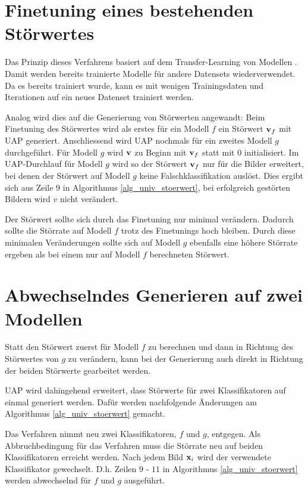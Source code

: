 \documentclass{FFHS_Thesis_Additions/ffhsthesis}
\begin{document}
\section{Finetuning eines bestehenden Störwertes}

Das Prinzip dieses Verfahrens basiert auf dem Transfer-Learning von Modellen \cite{shao_transfer_2015}. 
Damit werden bereits trainierte Modelle für andere Datensets wiederverwendet. 
Da es bereits trainiert wurde, kann es mit wenigen Trainingsdaten und Iterationen auf ein neues Datenset trainiert werden.

Analog wird dies auf die Generierung von Störwerten angewandt: Beim Finetuning des Störwertes wird als erstes für ein Modell $f$ ein Störwert $\bold{v}_f$ mit UAP generiert. 
Anschliessend wird UAP nochmals für ein zweites Modell $g$ durchgeführt. 
Für Modell $g$ wird $\bold{v}$ zu Beginn mit $\bold{v}_f$ statt mit $0$ initialisiert. 
Im UAP-Durchlauf für Modell $g$ wird so der Störwert $\bold{v}_f$ nur für die Bilder erweitert, bei denen der Störwert auf Modell $g$ keine Falschklassifikation auslöst. 
Dies ergibt sich aus Zeile $9$ in Algorithmus \ref{alg_univ_stoerwert}, bei erfolgreich gestörten Bildern wird $v$ nicht verändert. 

Der Störwert sollte sich durch das Finetuning nur minimal verändern. 
Dadurch sollte die Störrate auf Modell $f$ trotz des Finetunings hoch bleiben. 
Durch diese minimalen Veränderungen sollte sich auf Modell $g$ ebenfalls eine höhere Störrate ergeben als bei einem nur auf Modell $f$ berechneten Störwert.


\section{Abwechselndes Generieren auf zwei Modellen}

Statt den Störwert zuerst für Modell $f$ zu berechnen und dann in Richtung des Störwertes von $g$ zu verändern, kann bei der Generierung auch direkt in Richtung der beiden Störwerte gearbeitet werden.

UAP wird dahingehend erweitert, dass Störwerte für zwei Klassifikatoren auf einmal generiert werden. 
Dafür werden nachfolgende Änderungen am Algorithmus \ref{alg_univ_stoerwert} gemacht. 

Das Verfahren nimmt neu zwei Klassifikatoren, $f$ und $g$, entgegen. 
Als Abbruchbedingung für das Verfahren muss die Störrate neu auf beiden Klassifikatoren erreicht werden. 
Nach jedem Bild $\bold{x}_i$ wird der verwendete Klassifikator gewechselt. 
D.h. Zeilen $9$ - $11$ in Algorithmus \ref{alg_univ_stoerwert} werden abwechselnd für $f$ und $g$ ausgeführt.
\end{document}
